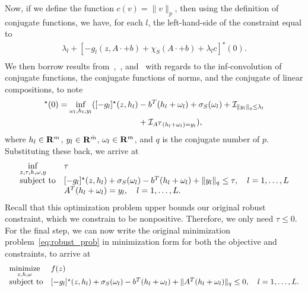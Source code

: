 Now, if we define the function $c(v) = \|v\|_p$, then using the definition of conjugate functions, we have, for each $l$, the left-hand-side of the constraint equal to
\begin{equation*}
\begin{aligned}
		\lambda_l + [-g_l(z,A\cdot+b) +\chi_S(A\cdot+b) + \lambda_l c]^\star(0).\\
\end{aligned}
\end{equation*}
We then borrow results from~\cite[Theorem 11.23(a), p. 493]{rockafellar_wets_1998},~\cite[Lemma C.9]{zhen2021mathematical}, and~\cite[Proposition 13.24]{composites} with regards to the inf-convolution of conjugate functions, the conjugate functions of norms, and the conjugate of linear compositions, to note
\begin{align*}
	[-g_l(z,A\cdot+b)   +\chi_S(A\cdot+b)+ \lambda_l c]^\star (0) =  \underset{\omega_l, h_l, y_l}{\inf} ([-g_l]^\star(z,h_l) &- b^T(h_l + \omega_l) + \sigma_S(\omega_l)+\indicator_{\|y_l\|_q \leq \lambda_l}\\
  &+ \indicator_{A^T(h_l + \omega_l)= y_l}),
\end{align*}
where  $h_l\in{\mathbf R}^{m}$, $y_l \in {\mathbf R}^{\hat{m}}$, $\omega_l \in {\mathbf R}^{m}$, and $q$ is the conjugate number of $p$. Substituting these back, we arrive at
\begin{equation*}
\begin{aligned}
\begin{array}[t]{ll}
\underset{z,\tau, h, \omega, y}{\inf} & \tau\\
\mbox{subject to} & [-g_l]^\star(z,h_l)+ \sigma_S(\omega_l)  -b^T(h_l + \omega_l) + \|y_l\|_q \leq \tau, \quad l = 1,\dots,L \\
 & A^T(h_l + \omega_l)= y_l,  \quad l = 1,\dots,L.
\end{array}
\end{aligned}
\end{equation*}
Recall that this optimization problem upper bounds our original robust constraint, which we constrain to be nonpositive. Therefore, we only need $\tau \leq 0$. For the final step, we can now write the original minimization problem~\eqref{eq:robust_prob} in minimization form for both the objective and constraints, to arrive at
\begin{equation*}
	\begin{aligned}
	\begin{array}[t]{ll}
	\underset{z, h, \omega}{\text{minimize}} & f(z)\\
	\mbox{subject to} & [-g_l]^\star(z,h_l)+ \sigma_S(\omega_l)  -b^T(h_l + \omega_l) + \|A^T(h_l + \omega_l) \|_q \leq 0, \quad l = 1,\dots,L.	\end{array}
	\end{aligned}
	\end{equation*}


